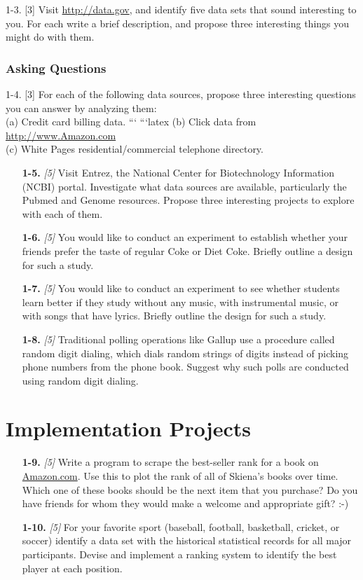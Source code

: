 \documentclass[10pt]{article}
\begin{document}
1-3. [3] Visit \href{http://data.gov}{http://data.gov}, and identify five data sets that sound interesting to you. For each write a brief description, and propose three interesting things you might do with them.

\subsubsection{Asking Questions}
1-4. [3] For each of the following data sources, propose three interesting questions you can answer by analyzing them:\\
(a) Credit card billing data.
```
```latex
(b) Click data from \href{http://www.Amazon.com}{http://www.Amazon.com}\\
(c) White Pages residential/commercial telephone directory.

\begin{enumerate}
    \setcounter{enumi}{4}
    \item[\textbf{1-5.}] \textit{[5] } Visit Entrez, the National Center for Biotechnology Information (NCBI) portal. Investigate what data sources are available, particularly the Pubmed and Genome resources. Propose three interesting projects to explore with each of them.
    \item[\textbf{1-6.}] \textit{[5] } You would like to conduct an experiment to establish whether your friends prefer the taste of regular Coke or Diet Coke. Briefly outline a design for such a study.\\
    \item[\textbf{1-7.}] \textit{[5] } You would like to conduct an experiment to see whether students learn better if they study without any music, with instrumental music, or with songs that have lyrics. Briefly outline the design for such a study.
    \item[\textbf{1-8.}] \textit{[5] } Traditional polling operations like Gallup use a procedure called random digit dialing, which dials random strings of digits instead of picking phone numbers from the phone book. Suggest why such polls are conducted using random digit dialing.
\end{enumerate}

\section*{Implementation Projects}
\begin{enumerate}
    \setcounter{enumi}{8}
    \item[\textbf{1-9.}] \textit{[5] } Write a program to scrape the best-seller rank for a book on \href{http://Amazon.com}{Amazon.com}. Use this to plot the rank of all of Skiena's books over time. Which one of these books should be the next item that you purchase? Do you have friends for whom they would make a welcome and appropriate gift? :-)
    \item[\textbf{1-10.}] \textit{[5] } For your favorite sport (baseball, football, basketball, cricket, or soccer) identify a data set with the historical statistical records for all major participants. Devise and implement a ranking system to identify the best player at each position.
\end{enumerate}
\end{document}
